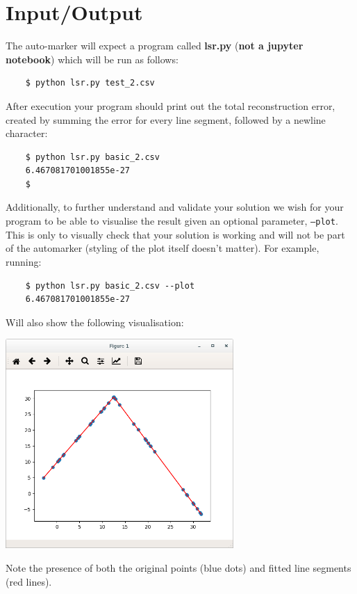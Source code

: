 \documentclass[10pt]{article}
\begin{document}
\section{Input/Output}
\label{sec:IO}

The auto-marker will expect a program called \textbf{lsr.py} (\textbf{not a jupyter notebook}) which will be run as follows:
\begin{verbatim}
    $ python lsr.py test_2.csv
\end{verbatim}

After execution your program should print out the total reconstruction error, created by summing the error for every line segment, followed by a newline character:

\begin{verbatim}
    $ python lsr.py basic_2.csv
    6.467081701001855e-27
    $
\end{verbatim}

Additionally, to further understand and validate your solution we wish for your program to be able to visualise the result given an optional parameter, \texttt{--plot}.
This is only to visually check that your solution is working and will not be part of the automarker (styling of the plot itself doesn't matter).
For example, running:

\begin{verbatim}
    $ python lsr.py basic_2.csv --plot
    6.467081701001855e-27
\end{verbatim}

Will also show the following visualisation:

\includegraphics[width=0.65\textwidth]{CW1_visualisation}

Note the presence of both the original points (blue dots) and fitted line segments (red lines).
\end{document}
